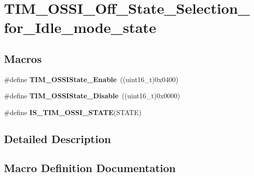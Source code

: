 \hypertarget{group___t_i_m___o_s_s_i___off___state___selection__for___idle__mode__state}{}\section{T\+I\+M\+\_\+\+O\+S\+S\+I\+\_\+\+Off\+\_\+\+State\+\_\+\+Selection\+\_\+for\+\_\+\+Idle\+\_\+mode\+\_\+state}
\label{group___t_i_m___o_s_s_i___off___state___selection__for___idle__mode__state}
\subsection*{Macros}
\begin{DoxyCompactItemize}
\item 
\hypertarget{group___t_i_m___o_s_s_i___off___state___selection__for___idle__mode__state_gaf643ec0d2edb6c8fb725d00210b3d071}{}\#define {\bfseries T\+I\+M\+\_\+\+O\+S\+S\+I\+State\+\_\+\+Enable}~((uint16\+\_\+t)0x0400)\label{group___t_i_m___o_s_s_i___off___state___selection__for___idle__mode__state_gaf643ec0d2edb6c8fb725d00210b3d071}

\item 
\hypertarget{group___t_i_m___o_s_s_i___off___state___selection__for___idle__mode__state_gae1962736fd5cad82e97a5814ef6758bd}{}\#define {\bfseries T\+I\+M\+\_\+\+O\+S\+S\+I\+State\+\_\+\+Disable}~((uint16\+\_\+t)0x0000)\label{group___t_i_m___o_s_s_i___off___state___selection__for___idle__mode__state_gae1962736fd5cad82e97a5814ef6758bd}

\item 
\#define {\bfseries I\+S\+\_\+\+T\+I\+M\+\_\+\+O\+S\+S\+I\+\_\+\+S\+T\+A\+T\+E}(S\+T\+A\+T\+E)
\end{DoxyCompactItemize}


\subsection{Detailed Description}


\subsection{Macro Definition Documentation}
\hypertarget{group___t_i_m___o_s_s_i___off___state___selection__for___idle__mode__state_gad24fc8836152903b408239284cecfab1}{}
